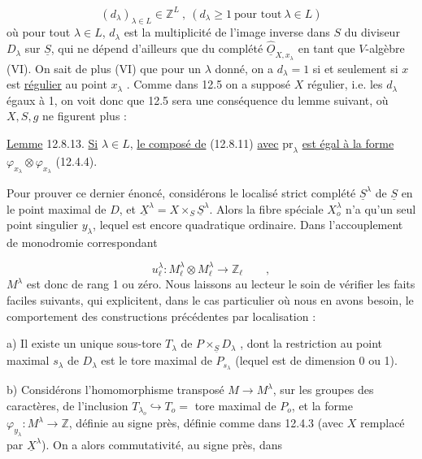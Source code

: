 
\begin{equation}\tag{12.8.12}
(d_\lambda)_{\lambda \in L} \in \mathbb{Z}^L \ , \ (d_\lambda \geqslant 1 \ \mbox{pour tout} \ \lambda \in L)
\end{equation}
où pour tout $\lambda \in L$, $d_\lambda$ est la multiplicité de l'image inverse dans $S$ du diviseur $D_\lambda$ sur $\underline{S}$, qui ne dépend d'ailleurs que du complété $\widehat{\underline{O}}_{X,x_\lambda}$ en tant que $V$-algèbre (VI\hspace{2.5em}). On sait de plus (VI\hspace{2.5em}) que pour un $\lambda$ donné, on a $d_\lambda = 1$ si et seulement si $x$ est \underline{régulier} au point $x_\lambda$ . Comme dans 12.5 on a supposé $X$ régulier, i.e. les $d_\lambda$ égaux à 1, on voit donc que 12.5 sera une conséquence du lemme suivant, où $X,S,g$ ne figurent plus :

\underline{Lemme} 12.8.13. \underline{Si} $\lambda \in L$, \underline{le composé de} (12.8.11) \underline{avec} $\mathrm{pr}_\lambda$ \underline{est égal à la forme} $\varphi_{x_\lambda} \otimes \varphi_{x_\lambda}$ (12.4.4).

Pour prouver ce dernier énoncé, considérons le localisé strict complété $\underline{S}^\lambda$ de $\underline{S}$ en le point maximal de $D$, et $\underline{X}^\lambda = X \times_{S} \underline{S}^\lambda$. Alors la fibre spéciale $X_o^\lambda$ n'a qu'un seul point singulier $y_\lambda$, lequel est encore quadratique ordinaire. Dans l'accouplement de monodromie correspondant

\begin{equation}\tag{12.8.14}
u_\ell^\lambda : M_\ell^\lambda \otimes M_\ell^\lambda \longrightarrow \mathbb{Z}_\ell \qquad ,
\end{equation}
$M^\lambda$ est donc de rang 1 ou zéro. Nous laissons au lecteur le soin de vérifier les faits faciles suivants, qui explicitent, dans le cas particulier où nous en avons besoin, le comportement des constructions précédentes par localisation :

a) Il existe un unique sous-tore $T_\lambda$ de $P \times_{\underline{S}} D_\lambda$ , dont la restriction au point maximal $s_\lambda$ de $D_\lambda$ est le tore maximal de $P_{s_\lambda}$ (lequel est de dimension 0 ou 1).



b)  Considérons l'homomorphisme transposé $M \longrightarrow M^{\lambda}$, sur les groupes des caractères, de l'inclusion $T_{\lambda_{o}} \hookrightarrow T_{o} =$ tore maximal de $P_{o}$, et la forme $\varphi_{y_{\lambda}} : M^{\lambda} \longrightarrow \mathbb{Z}$, définie au signe près, définie comme dans 12.4.3 (avec $X$ remplacé par $\underline{X}^{\lambda}$). On a alors commutativité, au signe près, dans


